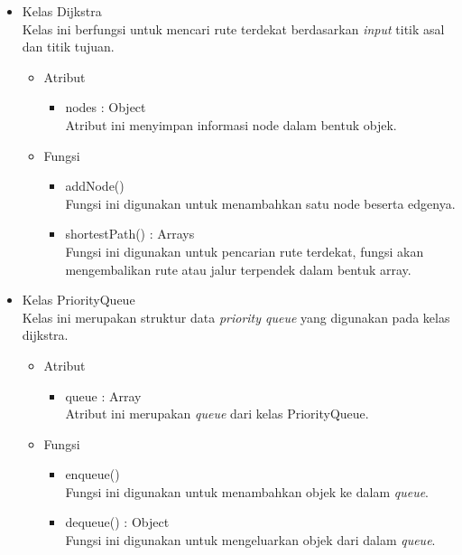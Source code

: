 \begin{itemize}
  \item Kelas Dijkstra\\
  Kelas ini berfungsi untuk mencari rute terdekat berdasarkan \textit{input}
  titik asal dan titik tujuan.
  \begin{itemize}
    \item Atribut
    \begin{itemize}
      \item nodes : Object\\
      Atribut ini menyimpan informasi node dalam bentuk objek.
    \end{itemize}
  \end{itemize}
  \begin{itemize}
    \item Fungsi
    \begin{itemize}
      \item addNode()\\
      Fungsi ini digunakan untuk menambahkan satu node beserta edgenya.
      
      \item shortestPath() : Arrays\\
      Fungsi ini digunakan untuk pencarian rute terdekat, fungsi akan
      mengembalikan rute atau jalur terpendek dalam bentuk array.
    \end{itemize}
  \end{itemize}
  
  \item Kelas PriorityQueue\\
  Kelas ini merupakan struktur data \textit{priority queue} yang digunakan pada
  kelas dijkstra.
  \begin{itemize}
    \item Atribut
    \begin{itemize}
      \item queue : Array\\
      Atribut ini merupakan \textit{queue} dari kelas PriorityQueue.
    \end{itemize}
  \end{itemize}
  \begin{itemize}
    \item Fungsi
    \begin{itemize}
      \item enqueue()\\
      Fungsi ini digunakan untuk menambahkan objek ke dalam \textit{queue}.
      
      \item dequeue() : Object\\
      Fungsi ini digunakan untuk mengeluarkan objek dari dalam \textit{queue}.
      

\end{itemize}
\end{itemize}
\end{itemize}
